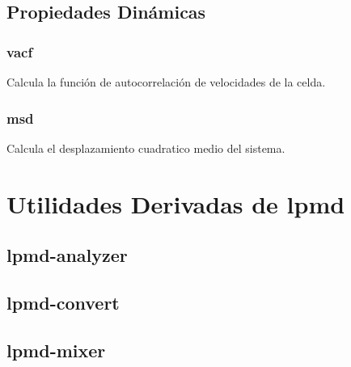 \documentclass[a4paper,10pt]{scrbook}
\begin{document}
\section{Propiedades Din\'amicas}
\subsection{vacf}
Calcula la funci\'on de autocorrelaci\'on de velocidades de la celda.
\subsection{msd}
Calcula el desplazamiento cuadratico medio del sistema.

\chapter{Utilidades Derivadas de lpmd}
\label{chap:utilidades}
\section{lpmd-analyzer}
\section{lpmd-convert}
\section{lpmd-mixer}

\end{document}
